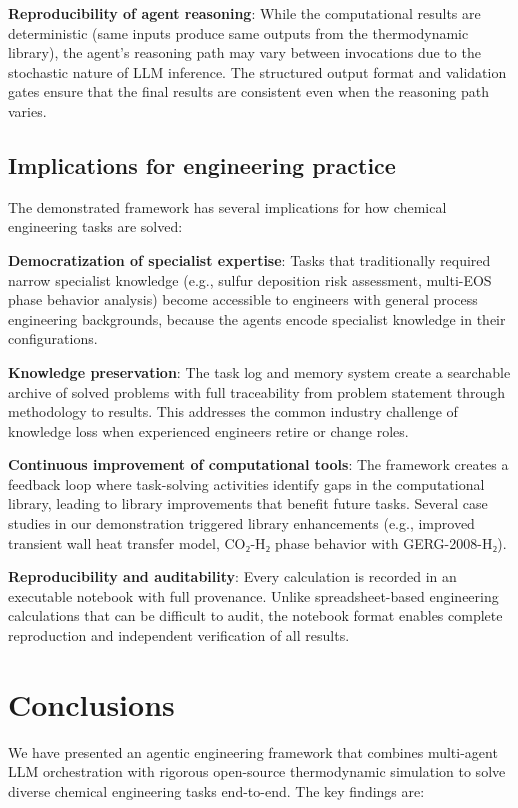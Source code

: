 \documentclass[review,3p]{elsarticle}
\begin{document}
\textbf{Reproducibility of agent reasoning}: While the computational results are deterministic (same inputs produce same outputs from the thermodynamic library), the agent's reasoning path may vary between invocations due to the stochastic nature of LLM inference. The structured output format and validation gates ensure that the final results are consistent even when the reasoning path varies.

\subsection{Implications for engineering practice}

The demonstrated framework has several implications for how chemical engineering tasks are solved:

\textbf{Democratization of specialist expertise}: Tasks that traditionally required narrow specialist knowledge (e.g., sulfur deposition risk assessment, multi-EOS phase behavior analysis) become accessible to engineers with general process engineering backgrounds, because the agents encode specialist knowledge in their configurations.

\textbf{Knowledge preservation}: The task log and memory system create a searchable archive of solved problems with full traceability from problem statement through methodology to results. This addresses the common industry challenge of knowledge loss when experienced engineers retire or change roles.

\textbf{Continuous improvement of computational tools}: The framework creates a feedback loop where task-solving activities identify gaps in the computational library, leading to library improvements that benefit future tasks. Several case studies in our demonstration triggered library enhancements (e.g., improved transient wall heat transfer model, CO₂-H₂ phase behavior with GERG-2008-H₂).

\textbf{Reproducibility and auditability}: Every calculation is recorded in an executable notebook with full provenance. Unlike spreadsheet-based engineering calculations that can be difficult to audit, the notebook format enables complete reproduction and independent verification of all results.


\section{Conclusions}

We have presented an agentic engineering framework that combines multi-agent LLM orchestration with rigorous open-source thermodynamic simulation to solve diverse chemical engineering tasks end-to-end. The key findings are:
\end{document}
